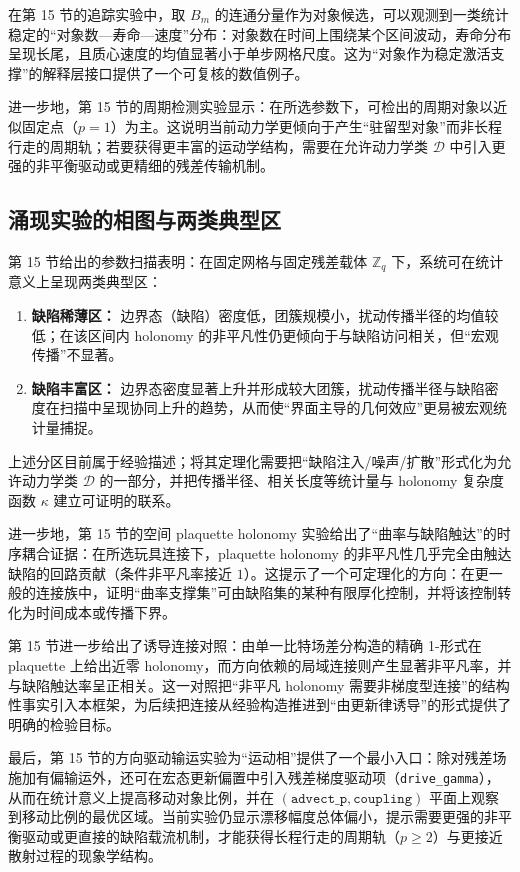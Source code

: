 在第 15 节的追踪实验中，取 $B_m$ 的连通分量作为对象候选，可以观测到一类统计稳定的“对象数—寿命—速度”分布：对象数在时间上围绕某个区间波动，寿命分布呈现长尾，且质心速度的均值显著小于单步网格尺度。这为“对象作为稳定激活支撑”的解释层接口提供了一个可复核的数值例子。

进一步地，第 15 节的周期检测实验显示：在所选参数下，可检出的周期对象以近似固定点（$p=1$）为主。这说明当前动力学更倾向于产生“驻留型对象”而非长程行走的周期轨；若要获得更丰富的运动学结构，需要在允许动力学类 $\mathcal D$ 中引入更强的非平衡驱动或更精细的残差传输机制。

\subsection{涌现实验的相图与两类典型区}

第 15 节给出的参数扫描表明：在固定网格与固定残差载体 $\mathbb Z_q$ 下，系统可在统计意义上呈现两类典型区：
\begin{enumerate}
  \item \textbf{缺陷稀薄区：} 边界态（缺陷）密度低，团簇规模小，扰动传播半径的均值较低；在该区间内 holonomy 的非平凡性仍更倾向于与缺陷访问相关，但“宏观传播”不显著。
  \item \textbf{缺陷丰富区：} 边界态密度显著上升并形成较大团簇，扰动传播半径与缺陷密度在扫描中呈现协同上升的趋势，从而使“界面主导的几何效应”更易被宏观统计量捕捉。
\end{enumerate}
上述分区目前属于经验描述；将其定理化需要把“缺陷注入/噪声/扩散”形式化为允许动力学类 $\mathcal D$ 的一部分，并把传播半径、相关长度等统计量与 holonomy 复杂度函数 $\kappa$ 建立可证明的联系。

进一步地，第 15 节的空间 plaquette holonomy 实验给出了“曲率与缺陷触达”的时序耦合证据：在所选玩具连接下，plaquette holonomy 的非平凡性几乎完全由触达缺陷的回路贡献（条件非平凡率接近 $1$）。这提示了一个可定理化的方向：在更一般的连接族中，证明“曲率支撑集”可由缺陷集的某种有限厚化控制，并将该控制转化为时间成本或传播下界。

第 15 节进一步给出了诱导连接对照：由单一比特场差分构造的精确 1-形式在 plaquette 上给出近零 holonomy，而方向依赖的局域连接则产生显著非平凡率，并与缺陷触达率呈正相关。这一对照把“非平凡 holonomy 需要非梯度型连接”的结构性事实引入本框架，为后续把连接从经验构造推进到“由更新律诱导”的形式提供了明确的检验目标。

最后，第 15 节的方向驱动输运实验为“运动相”提供了一个最小入口：除对残差场施加有偏输运外，还可在宏态更新偏置中引入残差梯度驱动项（\texttt{drive\_gamma}），从而在统计意义上提高移动对象比例，并在 $(\texttt{advect\_p},\texttt{coupling})$ 平面上观察到移动比例的最优区域。当前实验仍显示漂移幅度总体偏小，提示需要更强的非平衡驱动或更直接的缺陷载流机制，才能获得长程行走的周期轨（$p\ge 2$）与更接近散射过程的现象学结构。

